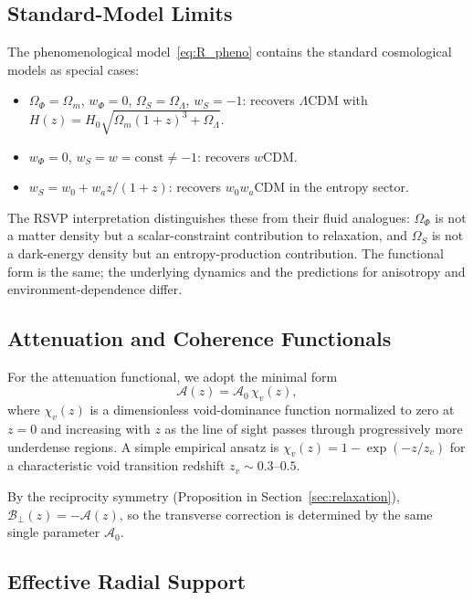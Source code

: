 \documentclass[12pt,a4paper]{article}
\theoremstyle{remark}
\newcommand{\Acal}{\mathcal{A}}
\newcommand{\Bcal}{\mathcal{B}}
\begin{document}
\subsection{Standard-Model Limits}

The phenomenological model~\eqref{eq:R_pheno} contains the standard cosmological
models as special cases:
\begin{itemize}[leftmargin=2em]
\item $\Omega_\Phi = \Omega_m$, $w_\Phi = 0$, $\Omega_S = \Omega_\Lambda$,
  $w_S = -1$: recovers $\Lambda$CDM with $H(z) = H_0\sqrt{\Omega_m(1+z)^3 + \Omega_\Lambda}$.
\item $w_\Phi = 0$, $w_S = w = \mathrm{const} \ne -1$: recovers $w$CDM.
\item $w_S = w_0 + w_a z/(1+z)$: recovers $w_0 w_a$CDM in the entropy sector.
\end{itemize}
The RSVP interpretation distinguishes these from their fluid analogues: $\Omega_\Phi$
is not a matter density but a scalar-constraint contribution to relaxation, and
$\Omega_S$ is not a dark-energy density but an entropy-production contribution.
The functional form is the same; the underlying dynamics and the predictions
for anisotropy and environment-dependence differ.

\subsection{Attenuation and Coherence Functionals}

For the attenuation functional, we adopt the minimal form
\begin{equation}
\Acal(z) = \Acal_0\,\chi_v(z),
\end{equation}
where $\chi_v(z)$ is a dimensionless void-dominance function normalized to
zero at $z = 0$ and increasing with $z$ as the line of sight passes through
progressively more underdense regions. A simple empirical ansatz is
$\chi_v(z) = 1 - \exp(-z/z_v)$ for a characteristic void transition redshift
$z_v \sim 0.3$--$0.5$.

By the reciprocity symmetry (Proposition in Section~\ref{sec:relaxation}),
$\Bcal_\perp(z) = -\Acal(z)$, so the transverse correction is determined by
the same single parameter $\Acal_0$.

\subsection{Effective Radial Support}
\end{document}
